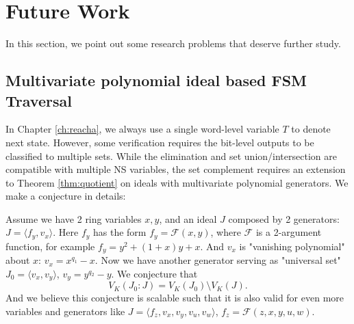 \section{Future Work}
In this section, we point out some research problems that deserve further study.
\subsection{Multivariate polynomial ideal based FSM Traversal}
In Chapter \ref{ch:reacha}, we always use a single word-level variable $T$ to denote 
next state. However, some verification requires the bit-level outputs to be classified to 
multiple sets. While the elimination and set union/intersection are compatible with multiple NS variables,
the set complement requires an extension to Theorem \ref{thm:quotient} on ideals with 
multivariate polynomial generators. We make a conjecture in details:

\begin{Conjecture}
Assume we have 2 ring variables $x,y$, and an ideal $J$ composed by 2 generators:
$J = \langle f_y, v_x\rangle$. Here $f_y$ has the form $f_y = \mathcal F(x,y)$, where $\mathcal F$
is a 2-argument function, for example $f_y = y^2+(1+x)y+x$. And $v_x$ is "vanishing polynomial" about
$x$: $v_x = x^{q_1} - x$. Now we have another generator serving as "universal set"
$J_0 = \langle v_x, v_y\rangle$, $v_y = y^{q_2} - y$.
We conjecture that
$$V_K(J_0:J) = V_K(J_0)\setminus V_K(J).$$
And we believe this conjecture is scalable such that it is also valid for even more variables and generators like 
$J = \langle f_z, v_x,v_y,v_u,v_w\rangle$, $f_z =\mathcal F (z,x,y,u,w)$.
\end{Conjecture}

